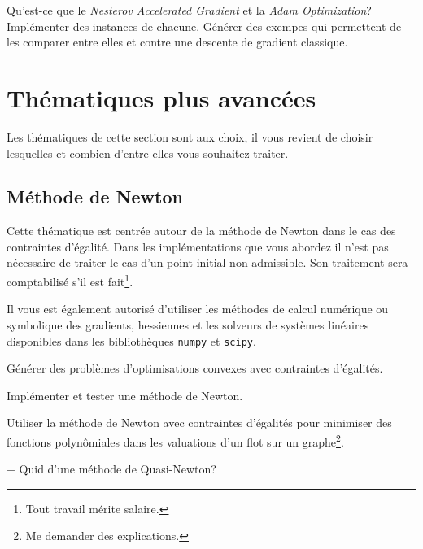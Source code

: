 \documentclass[11pt, a4paper]{article}
\begin{document}
\begin{question}
  Qu'est-ce que le \emph{Nesterov Accelerated Gradient} et la
  \emph{Adam Optimization}? Implémenter des instances de
  chacune. Générer des exempes qui permettent de les comparer entre
  elles et contre une descente de gradient classique.
\end{question}

\section{Thématiques plus avancées}

Les thématiques de cette section sont aux choix, il vous revient de
choisir lesquelles et combien d'entre elles vous souhaitez traiter.

\subsection{Méthode de Newton}

Cette thématique est centrée autour de la méthode de Newton dans le
cas des contraintes d'égalité. Dans les implémentations que vous
abordez il n'est pas nécessaire de traiter le cas d'un point initial
non-admissible. Son traitement sera comptabilisé s'il est
fait\footnote{Tout travail mérite salaire.}.

Il vous est également autorisé d'utiliser les méthodes de calcul
numérique ou symbolique des gradients, hessiennes et les solveurs de
systèmes linéaires disponibles dans les bibliothèques \texttt{numpy}
et \texttt{scipy}.

\begin{question}
  Générer des problèmes d'optimisations convexes avec contraintes
  d'égalités.
\end{question}

\begin{question}
  Implémenter et tester une méthode de Newton.
\end{question}

\begin{question}
  Utiliser la méthode de Newton avec contraintes d'égalités pour
  minimiser des fonctions polynômiales dans les valuations d'un flot
  sur un graphe\footnote{Me demander des explications.}.
\end{question}

\begin{question}{+}
  Quid d'une méthode de Quasi-Newton?
\end{question}
\end{document}
